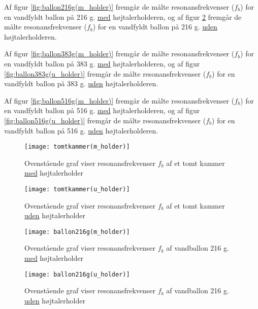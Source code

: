 Af figur \ref{fig:ballon216g(m_holder)} fremgår de målte resonansfrekvenser ($f_{b}$) for en vandfyldt ballon på 216 g. \underline{med} højtalerholderen, og af figur \ref{fig:ballon216g(u_holder)} fremgår de målte resonansfrekvenser ($f_{b}$) for en vandfyldt ballon på 216 g. \underline{uden} højtalerholderen.  

Af figur \ref{fig:ballon383g(m_holder)} fremgår de målte resonansfrekvenser ($f_{b}$) for en vandfyldt ballon på 383 g. \underline{med} højtalerholderen, og af figur \ref{fig:ballon383g(u_holder)} fremgår de målte resonansfrekvenser ($f_{b}$) for en vandfyldt ballon på 383 g. \underline{uden} højtalerholderen.  

Af figur \ref{fig:ballon516g(m_holder)} fremgår de målte resonansfrekvenser ($f_{b}$) for en vandfyldt ballon på 516 g. \underline{med} højtalerholderen, og af figur \ref{fig:ballon516g(u_holder)} fremgår de målte resonansfrekvenser ($f_{b}$) for en vandfyldt ballon på 516 g. \underline{uden} højtalerholderen.  

\begin{figure}[!h]
  \begin{minipage}[b]{1\linewidth}
    \centering
    \texttt{[image: tomtkammer(m\_holder)]}
    \caption{Ovenstående graf viser resonansfrekvenser $f_{b}$ af et tomt kammer \underline{med} højtalerholder}
    \label{fig:tomtkammer(m_holder)}
  \end{minipage}
  \hspace{1cm}
  \begin{minipage}[b]{1\linewidth}
    \centering
    \texttt{[image: tomtkammer(u\_holder)]}
    \caption{Ovenstående graf viser resonansfrekvenser $f_{b}$ af et tomt kammer \underline{uden} højtalerholder}
    \label{fig:tomtkammer(u_holder)}
  \end{minipage}
\end{figure}


\begin{figure}[htbp]
  \begin{minipage}[b]{1\linewidth}
    \centering
    \texttt{[image: ballon216g(m\_holder)]}
    \caption{Ovenstående graf viser resonansfrekvenser $f_{b}$  af vandballon 216 g. \underline{med} højtalerholder}
    \label{fig:ballon216g(m_holder)}
  \end{minipage}
  \hspace{1cm}
  \begin{minipage}[b]{1\linewidth}
    \centering
    \texttt{[image: ballon216g(u\_holder)]}
    \caption{Ovenstående graf viser resonansfrekvenser $f_{b}$  af vandballon 216 g. \underline{uden} højtalerholder}
    \label{fig:ballon216g(u_holder)}
  \end{minipage}
\end{figure}


